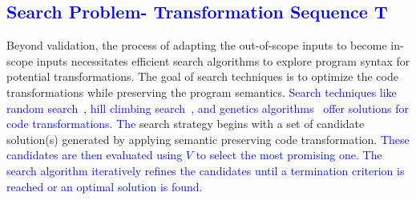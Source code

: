 
\subsection{\textcolor{blue}{Search Problem- Transformation Sequence T}}
Beyond validation, the process of adapting the out-of-scope inputs to become in-scope inputs necessitates efficient search algorithms to explore program syntax for potential transformations. The goal of search techniques is to optimize the code transformations while preserving the program semantics. \textcolor{blue}{Search techniques like random search~\cite{zabinsky2009random}, hill climbing search~\cite{selman2006hill}, and genetics algorithms~\cite{harman2001search} offer solutions for code transformations. }
\textcolor{blue}{The} search strategy begins with a set of candidate solution(s) generated by applying semantic preserving code transformation. 
\textcolor{blue}{These candidates are then evaluated using \(V\) to select the most promising one.} 
\textcolor{blue}{The search algorithm iteratively refines the candidates until a termination criterion is reached or an optimal solution is found.}






